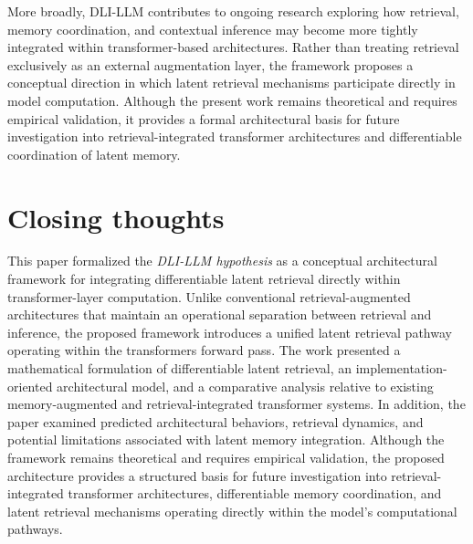 \label{broader-architectural-implications}
More broadly, DLI-LLM contributes to ongoing research exploring how retrieval, memory coordination, and contextual inference may become more tightly integrated within transformer-based architectures. Rather than treating retrieval exclusively as an external augmentation layer, the framework proposes a conceptual direction in which latent retrieval mechanisms participate directly in model computation.
Although the present work remains theoretical and requires empirical validation, it provides a formal architectural basis for future investigation into retrieval-integrated transformer architectures and differentiable coordination of latent memory.
\hypertarget{closing}{%
\section{Closing thoughts}}
\label{closing}
This paper formalized the \emph{DLI-LLM hypothesis} as a conceptual architectural framework for integrating differentiable latent retrieval directly within transformer-layer computation. Unlike conventional
retrieval-augmented architectures that maintain an operational separation between retrieval and inference, the proposed framework introduces a unified latent retrieval pathway operating within the transformer\textquotesingle s forward pass.
The work presented a mathematical formulation of differentiable latent retrieval, an implementation-oriented architectural model, and a comparative analysis relative to existing memory-augmented and retrieval-integrated transformer systems. In addition, the paper examined predicted architectural behaviors, retrieval dynamics, and potential limitations associated with latent memory integration.
Although the framework remains theoretical and requires empirical validation, the proposed architecture provides a structured basis for future investigation into retrieval-integrated transformer architectures, differentiable memory coordination, and latent retrieval mechanisms operating directly within the model's computational pathways.
